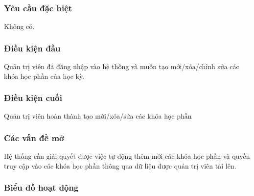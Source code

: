\documentclass[./../main_file.tex]{subfiles}
\begin{document}
\subsubsection{Yêu cầu đặc biệt}
Không có.

\subsubsection{Điều kiện đầu}
Quản trị viên đã đăng nhập vào hệ thống và muốn tạo mới/xóa/chỉnh sửa các khóa học phần của học kỳ.

\subsubsection{Điều kiện cuối}
Quản trị viên hoàn thành tạo mới/xóa/sửa các khóa học phần

\subsubsection{Các vấn đề mở}
Hệ thống cần giải quyết được việc tự động thêm mới các khóa học phần và quyền truy cập vào các khóa học phần thông qua dữ liệu được quản trị viên tải lên.

\subsubsection{Biểu đồ hoạt động}
	
\end{document}
